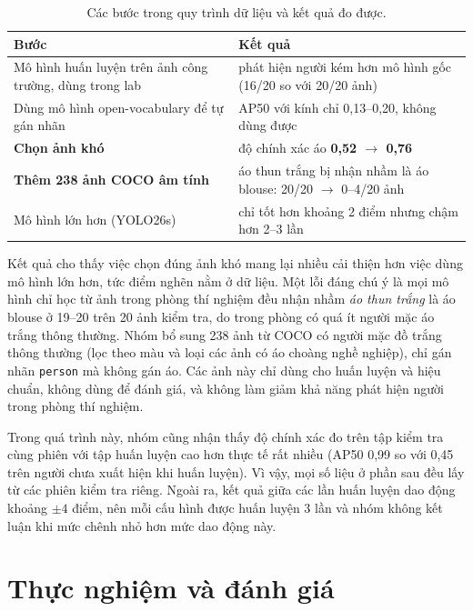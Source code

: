 \documentclass[11pt,a4paper,twocolumn]{article}
\begin{document}
\begin{table}[t]
\centering
\caption{Các bước trong quy trình dữ liệu và kết quả đo được.}
\label{tab:data}
\footnotesize
\begin{tabular}{@{}>{\raggedright\arraybackslash}p{3.4cm}>{\raggedright\arraybackslash}p{4.6cm}@{}}
\toprule
Bước & Kết quả \\
\midrule
Mô hình huấn luyện trên ảnh công trường, dùng trong lab & phát hiện người kém hơn mô hình gốc (16/20 so với 20/20 ảnh) \\
Dùng mô hình open-vocabulary để tự gán nhãn & AP50 với kính chỉ 0,13--0,20, không dùng được \\
\textbf{Chọn ảnh khó} & độ chính xác áo \textbf{0,52 $\to$ 0,76} \\
\textbf{Thêm 238 ảnh COCO âm tính} & áo thun trắng bị nhận nhầm là áo blouse: 20/20 $\to$ 0--4/20 ảnh \\
Mô hình lớn hơn (YOLO26s) & chỉ tốt hơn khoảng 2 điểm nhưng chậm hơn 2--3 lần \\
\bottomrule
\end{tabular}
\end{table}

Kết quả cho thấy việc chọn đúng ảnh khó mang lại nhiều cải thiện hơn việc dùng mô hình lớn hơn, tức điểm nghẽn nằm ở dữ liệu. Một lỗi đáng chú ý là mọi mô hình chỉ học từ ảnh trong
phòng thí nghiệm đều nhận nhầm \emph{áo thun trắng} là áo blouse ở 19--20 trên 20 ảnh kiểm tra, do trong phòng có quá ít người mặc áo trắng thông thường. Nhóm bổ sung 238 ảnh từ COCO \cite{coco}
có người mặc đồ trắng thông thường (lọc theo màu và loại các ảnh có áo choàng nghề nghiệp), chỉ gán nhãn \texttt{person} mà không gán áo. Các ảnh này chỉ dùng cho huấn luyện và hiệu chuẩn, không
dùng để đánh giá, và không làm giảm khả năng phát hiện người trong phòng thí nghiệm.

Trong quá trình này, nhóm cũng nhận thấy độ chính xác đo trên tập kiểm tra cùng phiên với tập huấn luyện cao hơn thực tế rất nhiều (AP50 0,99 so với 0,45 trên người chưa xuất hiện khi huấn luyện).
Vì vậy, mọi số liệu ở phần sau đều lấy từ các phiên kiểm tra riêng. Ngoài ra, kết quả giữa các lần huấn luyện dao động khoảng $\pm4$ điểm, nên mỗi cấu hình được huấn luyện 3 lần và nhóm không
kết luận khi mức chênh nhỏ hơn mức dao động này.

\section{Thực nghiệm và đánh giá}
\end{document}
